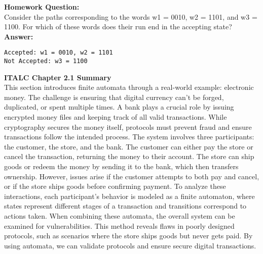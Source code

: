 \documentclass{article}
\theoremstyle{theorem}
\theoremstyle{definition}
\theoremstyle{remark}
\begin{document}
\textbf{Homework Question:} \\
Consider the paths corresponding to the words w1 = 0010, w2 = 1101,
and w3 = 1100. For which of these words does their run end in the accepting state? \\
\textbf{Answer:} 
\begin{lstlisting}
Accepted: w1 = 0010, w2 = 1101 
Not Accepted: w3 = 1100
\end{lstlisting}

\textbf{ITALC Chapter 2.1 Summary} \\
This section introduces finite automata through a real-world example: electronic money. 
The challenge is ensuring that digital currency can’t be forged, duplicated, or spent multiple times. 
A bank plays a crucial role by issuing encrypted money files and keeping track of all valid transactions. 
While cryptography secures the money itself, protocols must prevent fraud and ensure transactions follow the intended process.
The system involves three participants: the customer, the store, and the bank. The customer can either pay the store or cancel the transaction, returning the money to their account. 
The store can ship goods or redeem the money by sending it to the bank, which then transfers ownership. 
However, issues arise if the customer attempts to both pay and cancel, or if the store ships goods before confirming payment.
To analyze these interactions, each participant's behavior is modeled as a finite automaton, where states represent different stages of a transaction and transitions correspond to actions taken. 
When combining these automata, the overall system can be examined for vulnerabilities. This method reveals flaws in poorly designed protocols, such as scenarios where the store ships goods but never gets paid. 
By using automata, we can validate protocols and ensure secure digital transactions.
\end{document}
